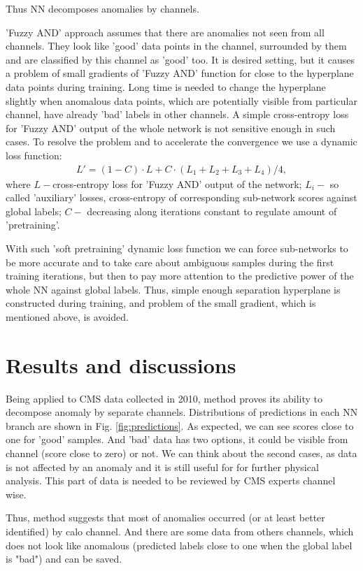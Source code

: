 \documentclass[a4paper]{jpconf}
\begin{document}
Thus NN decomposes anomalies by channels.


'Fuzzy AND' approach assumes that there are anomalies not seen from all channels. They look like 'good' data points in the channel, surrounded by them and are classified by this channel as 'good' too. It is desired setting, but it causes a problem of small gradients of 'Fuzzy AND' function for close to the hyperplane data points during training. Long time is needed to change the hyperplane slightly when anomalous data points, which are potentially visible from particular channel, have already 'bad' labels in other channels. A simple cross-entropy loss for 'Fuzzy AND' output of the whole network is not sensitive enough in such cases. To resolve the problem and to accelerate the convergence we use a dynamic loss function:
\begin{eqnarray}
L' = (1-C) \cdot L + C \cdot (L_1 + L_2 + L_3 + L_4)/ 4 ,
\end{eqnarray}
where $L - $cross-entropy loss for 'Fuzzy AND' output of the network; $L_i - $ so called 'auxiliary' losses, cross-entropy of corresponding sub-network scores against global labels; $C - $ decreasing along iterations constant to regulate amount of 'pretraining'.

With such 'soft pretraining' dynamic loss function we can force sub-networks to be more accurate and to take care about ambiguous samples during the first training iterations, but then to pay more attention to the predictive power of the whole NN against global labels. Thus, simple enough separation hyperplane is constructed during training, and problem of the small gradient, which is mentioned above, is avoided.

\section{Results and discussions}
Being applied to CMS data collected in 2010, method proves its ability to decompose anomaly by separate channels. Distributions of predictions in each NN branch are shown in Fig. \ref{fig:predictions}. As expected, we can see scores close to one for 'good' samples. And 'bad' data has two options, it could be visible from channel (score close to zero) or not. We can think about the second cases, as data is not affected by an anomaly and it is still useful for for further physical analysis. This part of data is needed to be reviewed by CMS experts channel wise.

Thus, method suggests that most of anomalies occurred (or at least better identified) by calo channel. And there are some data from others channels, which does not look like anomalous (predicted labels close to one when the global label is "bad") and can be saved.
\end{document}
